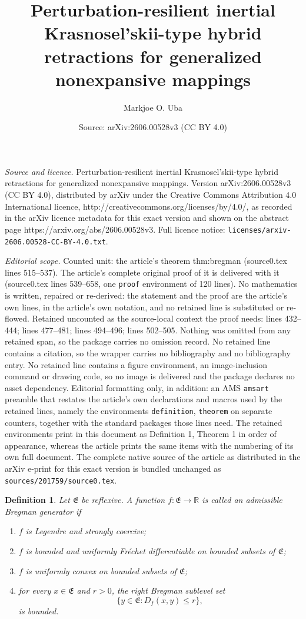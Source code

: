 \documentclass[10pt,a4paper]{amsart}
\title{Perturbation-resilient inertial Krasnosel'skii-type hybrid retractions for generalized nonexpansive mappings}
\author{Markjoe O. Uba}
\date{Source: arXiv:2606.00528v3 (CC BY 4.0)}
\newtheorem{definition}{Definition}
\newcommand{\E}{\mathfrak{E}}
\def\R{\mathbb{R}}
\begin{document}
\maketitle

\noindent\emph{Source and licence.} Perturbation-resilient inertial Krasnosel'skii-type hybrid retractions for generalized nonexpansive mappings. Version arXiv:2606.00528v3 (CC BY 4.0), distributed by arXiv under the Creative Commons Attribution 4.0 International licence, http://creativecommons.org/licenses/by/4.0/, as recorded in the arXiv licence metadata for this exact version and shown on the abstract page https://arxiv.org/abs/2606.00528v3. Full licence notice: \texttt{licenses/arxiv-2606.00528-CC-BY-4.0.txt}.\par\smallskip

\noindent\textit{Editorial scope.} Counted unit: the article's theorem thm:bregman (source0.tex lines 515--537). The article's complete original proof of it is delivered with it (source0.tex lines 539--658, one \texttt{proof} environment of 120 lines). No mathematics is written, repaired or re-derived: the statement and the proof are the article's own lines, in the article's own notation, and no retained line is substituted or re-flowed.  Retained uncounted as the source-local context the proof needs: lines 432--444; lines 477--481; lines 494--496; lines 502--505.  Nothing was omitted from any retained span, so the package carries no omission record.  No retained line contains a citation, so the wrapper carries no bibliography and no bibliography entry.  No retained line contains a figure environment, an image-inclusion command or drawing code, so no image is delivered and the package declares no asset dependency.  Editorial formatting only, in addition: an AMS \texttt{amsart} preamble that restates the article's own declarations and macros used by the retained lines, namely the environments \texttt{definition}, \texttt{theorem} on separate counters, together with the standard packages those lines need.  The retained environments print in this document as Definition 1, Theorem 1 in order of appearance, whereas the article prints the same items with the numbering of its own full document.  The complete native source of the article as distributed in the arXiv e-print for this exact version is bundled unchanged as \texttt{sources/201759/source0.tex}.
\begin{definition}\label{def:admissible-bregman}
Let $\E$ be reflexive. A function $f:\E\to\R$ is called an \emph{admissible Bregman generator} if
\begin{enumerate}
 \item $f$ is Legendre and strongly coercive;
 \item $f$ is bounded and uniformly Fr\'echet differentiable on bounded subsets of $\E$;
 \item $f$ is uniformly convex on bounded subsets of $\E$;
 \item for every $x\in\E$ and $r>0$, the right Bregman sublevel set
 \[
  \{y\in\E:D_f(x,y)\leq r\},
 \]
 is bounded.
\end{enumerate}
\end{definition}
\end{document}
